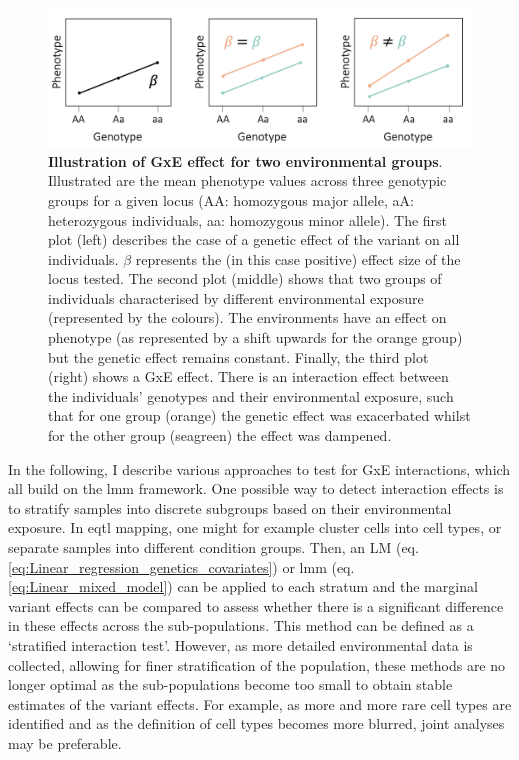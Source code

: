 \begin{figure}[h]
\centering
\includegraphics[width=16cm]{Chapter1/Fig/GxE.png}
\caption[Illustration of GxE]{\textbf{Illustration of GxE effect for two environmental groups}.\\
Illustrated are the mean phenotype values across three genotypic groups for a given locus (AA: homozygous major allele, aA: heterozygous individuals, aa: homozygous minor allele).
The first plot (left) describes the case of a genetic effect of the variant on all individuals. 
$\beta$ represents the (in this case positive) effect size of the locus tested. 
The second plot (middle) shows that two groups of individuals characterised by different environmental exposure (represented by the colours). 
The environments have an effect on phenotype (as represented by a shift upwards for the orange group) but the genetic effect remains constant. 
Finally, the third plot (right) shows a GxE effect.
There is an interaction effect between the individuals' genotypes and their environmental exposure, such that for one group (orange) the genetic effect was exacerbated whilst for the other group (seagreen) the effect was dampened.}
\label{fig:gxe}
\end{figure}

In the following, I describe various approaches to test for GxE interactions, which all build on the \gls{lmm} framework. 
One possible way to detect interaction effects is to stratify samples into discrete subgroups based on their environmental exposure. 
In \gls{eqtl} mapping, one might for example cluster cells into cell types, or separate samples into different condition groups.
Then, an LM (eq. \eqref{eq:Linear_regression_genetics_covariates}) or \gls{lmm} (eq. \eqref{eq:Linear_mixed_model}) can be applied to each stratum and the marginal variant effects can be compared to assess whether there is a significant difference in these effects across the sub-populations.
This method can be defined as a `stratified interaction test'.
However, as more detailed environmental data is collected, allowing for finer stratification of the population, these methods are no longer optimal as the sub-populations become too small to obtain stable estimates of the variant effects.
For example, as more and more rare cell types are identified and as the definition of cell types becomes more blurred, joint analyses may be preferable. \\

